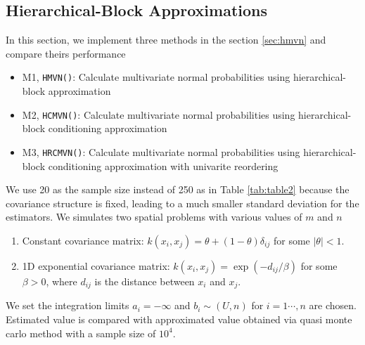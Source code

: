 \subsection{Hierarchical-Block Approximations}

In this section, we implement three methods in the section \ref{sec:hmvn} and compare theirs performance
\begin{itemize}
    \item M1, \texttt{HMVN()}: Calculate multivariate normal probabilities using hierarchical-block approximation
    \item M2, \texttt{HCMVN()}: Calculate multivariate normal probabilities using hierarchical-block conditioning approximation
    \item M3, \texttt{HRCMVN()}: Calculate multivariate normal probabilities using hierarchical-block conditioning approximation with univarite reordering
\end{itemize}

We use 20 as the sample size instead of 250 as in Table \ref{tab:table2} because the covariance structure is ﬁxed, leading to a much smaller standard deviation for the estimators. We simulates two spatial problems with various values of $m$ and $n$

\begin{enumerate}
	\item Constant covariance matrix: $k(x_i, x_j) = \theta + (1-\theta)\delta_{ij}$ for some $|\theta| < 1$.
	\item 1D exponential covariance matrix: $k(x_i, x_j) = \exp(-d_{ij}/\beta)$ for some $\beta > 0$, where $d_{ij}$ is the distance between $x_i$ and $x_j$.
\end{enumerate}

We set the integration limits $a_i=-\infty$ and $b_i\sim(U,n)$ for $i=1\cdots,n$ are chosen. Estimated value is compared with approximated value obtained via quasi monte carlo method with a sample size of $10^4$.

			

